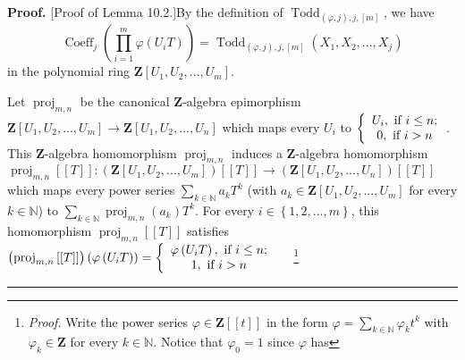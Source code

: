 \documentclass[numbers=enddot,12pt,final,onecolumn,notitlepage]{scrartcl}%
\newenvironment{proof}[1][Proof]{\noindent\textbf{#1.} }{\ \rule{0.5em}{0.5em}}
\begin{document}
\begin{proof}
[Proof of Lemma 10.2.]By the definition of $\operatorname*{Todd}%
\nolimits_{\left(  \varphi,j\right)  ,j,\left[  m\right]  }$, we have%
\begin{equation}
\operatorname*{Coeff}\nolimits_{j}\left(  \prod\limits_{i=1}^{m}\varphi\left(
U_{i}T\right)  \right)  =\operatorname*{Todd}\nolimits_{\left(  \varphi
,j\right)  ,j,\left[  m\right]  }\left(  X_{1},X_{2},...,X_{j}\right)
\label{10.1.pf.1}%
\end{equation}
in the polynomial ring $\mathbf{Z}\left[  U_{1},U_{2},...,U_{m}\right]  $.

Let $\operatorname*{proj}\nolimits_{m,n}$ be the canonical $\mathbf{Z}%
$-algebra epimorphism $\mathbf{Z}\left[  U_{1},U_{2},...,U_{m}\right]
\rightarrow\mathbf{Z}\left[  U_{1},U_{2},...,U_{n}\right]  $ which maps every
$U_{i}$ to $\left\{
\begin{array}
[c]{c}%
U_{i},\text{ if }i\leq n;\\
0,\text{ if }i>n
\end{array}
\right.  $. This $\mathbf{Z}$-algebra homomorphism $\operatorname*{proj}%
\nolimits_{m,n}$ induces a $\mathbf{Z}$-algebra homomorphism
$\operatorname*{proj}\nolimits_{m,n}\left[  \left[  T\right]  \right]
:\left(  \mathbf{Z}\left[  U_{1},U_{2},...,U_{m}\right]  \right)  \left[
\left[  T\right]  \right]  \rightarrow\left(  \mathbf{Z}\left[  U_{1}%
,U_{2},...,U_{n}\right]  \right)  \left[  \left[  T\right]  \right]  $ which
maps every power series $\sum\limits_{k\in\mathbb{N}}a_{k}T^{k}$ (with
$a_{k}\in\mathbf{Z}\left[  U_{1},U_{2},...,U_{m}\right]  $ for every
$k\in\mathbb{N}$) to $\sum\limits_{k\in\mathbb{N}}\operatorname*{proj}%
\nolimits_{m,n}\left(  a_{k}\right)  T^{k}$. For every $i\in\left\{
1,2,...,m\right\}  $, this homomorphism $\operatorname*{proj}\nolimits_{m,n}%
\left[  \left[  T\right]  \right]  $ satisfies $\left(  \operatorname*{proj}%
\nolimits_{m,n}\left[  \left[  T\right]  \right]  \right)  \left(
\varphi\left(  U_{i}T\right)  \right)  =\left\{
\begin{array}
[c]{c}%
\varphi\left(  U_{i}T\right)  ,\ \text{if }i\leq n;\\
1,\text{\ if }i>n
\end{array}
\right.  \ \ \ \ $\footnote{\textit{Proof.} Write the power series $\varphi
\in\mathbf{Z}\left[  \left[  t\right]  \right]  $ in the form $\varphi
=\sum\limits_{k\in\mathbb{N}}\varphi_{k}t^{k}$ with $\varphi_{k}\in\mathbf{Z}$
for every $k\in\mathbb{N}$. Notice that $\varphi_{0}=1$ since $\varphi$ has
}
\end{proof}
\end{document}
